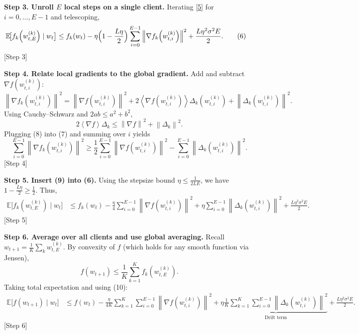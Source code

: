 \documentclass{article}
\newcommand{\E}{\mathbb{E}}
\newcommand{\norm}[1]{\left\|#1\right\|}
\newcommand{\inner}[1]{\left\langle#1\right\rangle}
\begin{document}
\noindent\textbf{Step 3.  Unroll $E$ local steps on a single client.}  
Iterating \eqref{5} for $i=0,\dots,E-1$ and telescoping,
\begin{align}
\E\!\bigl[f_k\!\left(w_{t,E}^{(k)}\right)\mid w_t\bigr]
&\le f_k(w_t)
   -\eta\Bigl(1-\frac{L\eta}{2}\Bigr)
      \sum_{i=0}^{E-1}\norm{\nabla f_k\!\left(w_{t,i}^{(k)}\right)}^2
   +\frac{L\eta^2\sigma^2E}{2}.
\tag{6}
\end{align}
\hfill[Step 3]

\noindent\textbf{Step 4.  Relate local gradients to the global gradient.}  
Add and subtract $\nabla f(w_{t,i}^{(k)})$:
\[
\norm{\nabla f_k\!\left(w_{t,i}^{(k)}\right)}^2
= \norm{\nabla f\!\left(w_{t,i}^{(k)}\right)}^2
  +2\inner{\nabla f\!\left(w_{t,i}^{(k)}\right)}{\Delta_k\!\left(w_{t,i}^{(k)}\right)}
  +\norm{\Delta_k\!\left(w_{t,i}^{(k)}\right)}^2 .
\tag{7}
\]
Using Cauchy–Schwarz and $2ab\le a^2+b^2$,
\[
2\inner{\nabla f}{\Delta_k}\le \norm{\nabla f}^2+\norm{\Delta_k}^2 .
\tag{8}
\]
Plugging (8) into (7) and summing over $i$ yields
\[
\sum_{i=0}^{E-1}\norm{\nabla f_k\!\left(w_{t,i}^{(k)}\right)}^2
\ge \frac12\sum_{i=0}^{E-1}\norm{\nabla f\!\left(w_{t,i}^{(k)}\right)}^2
    -\sum_{i=0}^{E-1}\norm{\Delta_k\!\left(w_{t,i}^{(k)}\right)}^2 .
\tag{9}
\]
\hfill[Step 4]

\noindent\textbf{Step 5.  Insert (9) into (6).}  
Using the stepsize bound $\eta\le\frac{1}{2L E}$, we have $1-\frac{L\eta}{2}\ge \frac12$.
Thus,
\begin{align}
\E\!\bigl[f_k\!\left(w_{t,E}^{(k)}\right)\mid w_t\bigr]
&\le f_k(w_t)
   -\frac{\eta}{4}\sum_{i=0}^{E-1}\norm{\nabla f\!\left(w_{t,i}^{(k)}\right)}^2
   +\eta\sum_{i=0}^{E-1}\norm{\Delta_k\!\left(w_{t,i}^{(k)}\right)}^2
   +\frac{L\eta^2\sigma^2E}{2}.
\tag{10}
\end{align}
\hfill[Step 5]

\noindent\textbf{Step 6.  Average over all clients and use global averaging.}  
Recall $w_{t+1}= \frac1K\sum_{k} w_{t,E}^{(k)}$.  By convexity of $f$ (which holds for any
smooth function via Jensen),
\[
f(w_{t+1})\le \frac1K\sum_{k=1}^{K} f_k\!\left(w_{t,E}^{(k)}\right) .
\tag{11}
\]
Taking total expectation and using (10):
\begin{align}
\E\!\bigl[f(w_{t+1})\mid w_t\bigr]
&\le f(w_t)
   -\frac{\eta}{4K}\sum_{k=1}^{K}\sum_{i=0}^{E-1}
        \norm{\nabla f\!\left(w_{t,i}^{(k)}\right)}^2
   +\eta\underbrace{\frac1K\sum_{k=1}^{K}\sum_{i=0}^{E-1}
        \norm{\Delta_k\!\left(w_{t,i}^{(k)}\right)}^2}_{\text{Drift term}}
   +\frac{L\eta^2\sigma^2E}{2}.
\tag{12}
\end{align}
\hfill[Step 6]
\end{document}
